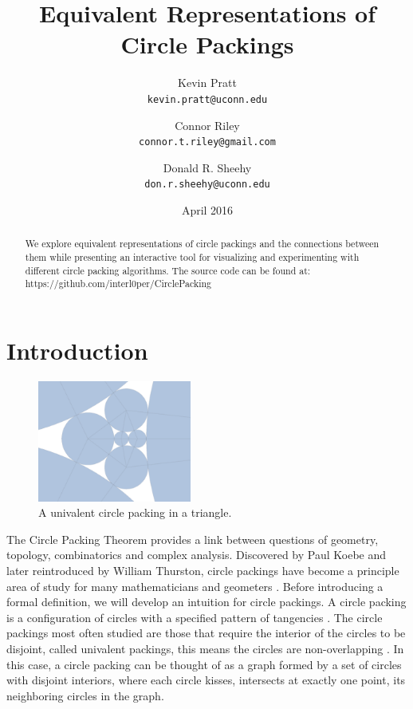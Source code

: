 \documentclass[11pt]{article}
\title{Equivalent Representations of Circle Packings}
\author{
  Kevin Pratt\\
  \texttt{kevin.pratt@uconn.edu}
  \and
  Connor Riley\\
  \texttt{connor.t.riley@gmail.com}
    \and
  Donald R. Sheehy\\
  \texttt{don.r.sheehy@uconn.edu}
}\date{April 2016}
\begin{document}
\maketitle

\begin{abstract}
  We explore equivalent representations of circle packings and the connections between them while presenting an interactive tool for visualizing and experimenting with different circle packing algorithms. 
  The source code can be found at: https://github.com/interl0per/CirclePacking
\end{abstract}

\section{Introduction}

\begin{figure}
  \begin{center}
    \includegraphics[scale=.18,width=0.45\textwidth]{circlepacking_1}
  \end{center}
  \caption{A univalent circle packing in a triangle.}
\end{figure}

The Circle Packing Theorem provides a link between questions of geometry, topology, combinatorics and complex analysis. Discovered by Paul Koebe and later reintroduced by William Thurston, circle packings have become a principle area of study for many mathematicians and geometers \cite{wilkerson}. Before introducing a formal definition, we will develop an intuition for circle packings. A circle packing is a configuration of circles with a specified pattern of tangencies \cite{stephenson05introduction}. The circle packings most often studied are those that require the interior of the circles to be disjoint, called univalent packings, this means the circles are non-overlapping \cite{stephenson05introduction}. In this case, a circle packing can be thought of as a graph formed by a set of circles with disjoint interiors, where each circle kisses, intersects at exactly one point, its neighboring circles in the graph.
\end{document}
